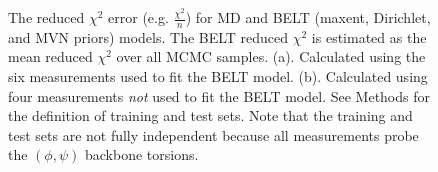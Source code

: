 \documentclass[11pt,titlepage]{article}
\begin{document}
\begin{figure}
\caption{
The reduced $\chi^2$ error (e.g. $\frac{\chi^2}{n}$) for MD and BELT (maxent, Dirichlet, and MVN priors) models.  The BELT reduced $\chi^2$ is estimated as the mean reduced $\chi^2$ over all MCMC samples.  (a).  Calculated using the six measurements used to fit the BELT model.  (b).  Calculated using four measurements \emph{not} used to fit the BELT model.  See Methods for the definition of training and test sets.  Note that the training and test sets are not fully independent because all measurements probe the $(\phi, \psi)$ backbone torsions.
}
\label{figure:ChiSquared}
\end{figure}
\end{document}
